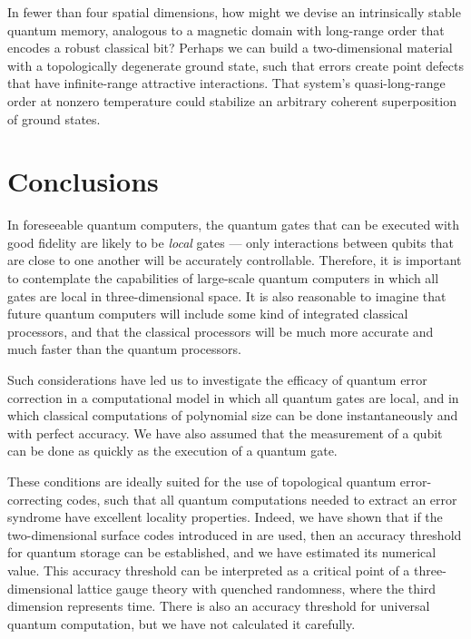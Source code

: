 In fewer than four spatial dimensions, how might we devise an intrinsically stable quantum memory, analogous to a magnetic domain with long-range order that encodes a robust classical bit? Perhaps we can build a two-dimensional material with a topologically degenerate ground state, such that errors create point defects that have infinite-range attractive interactions. That system's quasi-long-range order at nonzero temperature could stabilize an arbitrary coherent superposition of ground states.

\section{Conclusions}
\label{sec:conclusions}

In foreseeable quantum computers, the quantum gates that can be executed with good fidelity are likely to be {\em local} gates --- only interactions between qubits that are close to one another will be accurately controllable. Therefore, it is important to contemplate the capabilities of large-scale quantum computers in which all gates are local in three-dimensional space. It is also reasonable to imagine that future quantum computers will include some kind of integrated classical processors, and that the classical processors will be much more accurate and much faster than the quantum processors. 

Such considerations have led us to investigate the efficacy of quantum error correction in a computational model in which all quantum gates are local, and in which classical computations of polynomial size can be done instantaneously and with perfect accuracy. We have also assumed that the measurement of a qubit can be done as quickly as the execution of a quantum gate. 

These conditions are ideally suited for the use of topological quantum error-correcting codes, such that all quantum computations needed to extract an error syndrome have excellent locality properties. Indeed, we have shown that if the two-dimensional surface codes introduced in \cite{kitaev1,kitaev2} are used, then an accuracy threshold for quantum storage can be established, and we have estimated its numerical value. This accuracy threshold can be interpreted as a critical point of a three-dimensional lattice gauge theory with quenched randomness, where the third dimension represents time. There is also an accuracy threshold for universal quantum computation, but we have not calculated it carefully.

